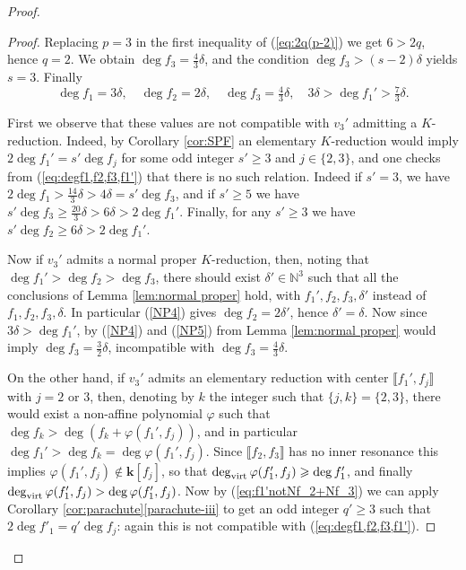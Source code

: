\documentclass[reqno,oneside,11pt]{amsart}
\theoremstyle{plain}
\theoremstyle{definition}
\newcommand{\N}{\mathbb{N}}
\newcommand{\K}{\mathbf{k}}
\renewcommand{\phi}{\varphi}
\newcommand{\dvirt}{\deg_{\text{\rm virt}}}
\newcommand{\llb}{\llbracket}
\newcommand{\rrb}{\rrbracket}
\renewcommand{\ge}{\geqslant}
\begin{document}
\begin{proof}
\begin{proof}
Replacing $p = 3$ in the first inequality of (\ref{eq:2q(p-2)}) we get $6 > 2q$,
hence $q = 2$.
We obtain $\deg f_3 = \frac{4}{3}\delta$, and the condition $\deg f_3 >
(s-2)\delta$ yields $s = 3$.
Finally
\begin{equation} \label{eq:degf1,f2,f3,f1'}
\deg f_1 = 3\delta, \quad \deg f_2 = 2\delta, \quad \deg f_3 = \tfrac{4}{3}
\delta, \quad 3\delta > \deg f_1' > \tfrac{7}{3} \delta.
\end{equation}

First we observe that these values are not compatible with $v_3'$ admitting a
$K$-reduction.
Indeed, by Corollary \ref{cor:SPF} an elementary $K$-reduction would imply $2
\deg f_1' = s' \deg f_j$ for some odd integer $s' \ge 3$ and $j \in \{2,3\}$,
and one checks from
(\ref{eq:degf1,f2,f3,f1'}) that there is no such relation.
Indeed if $s' = 3$, we have $2\deg f_1 > \frac{14}{3}\delta > 4\delta = s'\deg
f_3$, and if $s' \ge 5$ we have $s' \deg f_3 \ge \frac{20}{3} \delta > 6 \delta
> 2 \deg f_1'$.
Finally, for any $s' \ge 3$ we have $s' \deg f_2 \ge 6 \delta > 2 \deg f_1'$.

Now if $v_3'$ admits a normal proper $K$-reduction, then, noting that $\deg
f_1' > \deg f_2 > \deg f_3$, there should exist $\delta' \in \N^3$ such that all
the conclusions of Lemma \ref{lem:normal proper} hold, with $f_1', f_2, f_3,
\delta'$ instead of $f_1, f_2, f_3, \delta$.
In particular (\ref{NP4}) gives $\deg f_2 = 2 \delta'$, hence $\delta' =
\delta$.
Now since $3\delta > \deg f_1'$, by (\ref{NP4}) and (\ref{NP5}) from Lemma
\ref{lem:normal proper} would imply $\deg f_3 = \frac32 \delta$, incompatible
with $\deg f_3 = \tfrac{4}{3} \delta$.

On the other hand, if $v_3'$ admits an elementary reduction with center $\llb
f_1', f_j \rrb$ with $j = 2$ or $3$,
then, denoting by $k$ the integer such that $\{j,k\} = \{2,3\}$, there would
exist a non-affine polynomial $\phi$ such that $\deg f_k > \deg (f_k +
\phi(f_1', f_j))$, and in particular
$\deg f_1' > \deg f_k = \deg \phi(f_1', f_j)$.
Since $\llb f_2, f_3 \rrb$ has no inner resonance this implies
$\phi(f_1', f_j) \not\in \K[f_j]$, so that $\dvirt \phi(f_1', f_j) \ge \deg
f_1'$, and finally $ \dvirt \phi(f_1', f_j) > \deg \phi(f_1', f_j)$.
Now by (\ref{eq:f1'notNf_2+Nf_3}) we can apply
Corollary \ref{cor:parachute}\ref{parachute-iii} to get  an odd
integer $q'\ge 3$ such that $2 \deg f'_1 = q' \deg f_j$: again
this is not compatible with (\ref{eq:degf1,f2,f3,f1'}).
\end{proof}


\end{proof}
\end{document}
